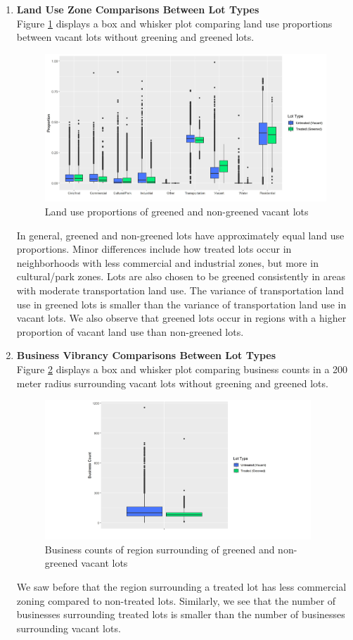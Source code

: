 \documentclass{article}
\begin{document}
\begin{enumerate}
    \item \textbf{Land Use Zone Comparisons Between Lot Types} \\
    Figure \ref{fig:figure7} displays a box and whisker plot comparing land use proportions between vacant lots without greening and greened lots.
    \begin{figure}[h]
    \includegraphics[width=12cm]{imgs/chart_land_use.jpg}
    \centering
    \caption{Land use proportions of greened and non-greened vacant lots}
    \label{fig:figure7}    
    \end{figure}
    In general, greened and non-greened lots have approximately equal land use proportions. Minor differences include how treated lots occur in neighborhoods with less commercial and industrial zones, but more in cultural/park zones. Lots are also chosen to be greened consistently in areas with moderate transportation land use. The variance of transportation land use in greened lots is smaller than the variance of transportation land use in vacant lots. We also observe that greened lots occur in regions with a higher proportion of vacant land use than non-greened lots.
    
     \item \textbf{Business Vibrancy Comparisons Between Lot Types} \\
    Figure \ref{fig:figure8} displays a box and whisker plot comparing business counts in a 200 meter radius surrounding vacant lots without greening and greened lots.
    \begin{figure}[h]
    \includegraphics[width=10cm]{imgs/chart_bus_count.jpg}
    \centering
    \caption{Business counts of region surrounding of greened and non-greened vacant lots}
    \label{fig:figure8}
    \end{figure}
    We saw before that the region surrounding a treated lot has less commercial zoning compared to non-treated lots. Similarly, we see that the number of businesses surrounding treated lots is smaller than the number of businesses surrounding vacant lots.
    

\end{enumerate}
\end{document}
